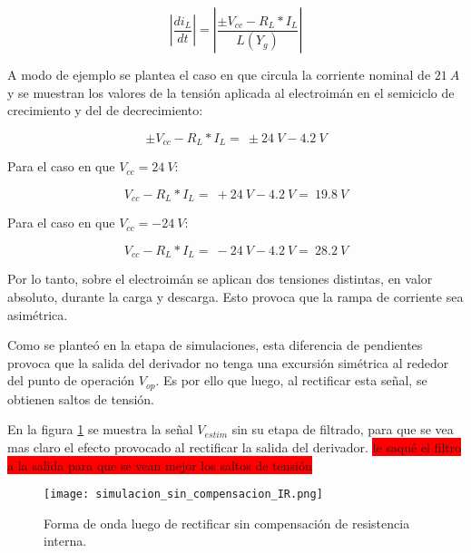 \begin{equation} \label{eq_Vbus-didt-RL}
	\left|\frac{di_L}{dt}\right|=\left|\frac{\pm V_{cc}-R_L*I_L}{L(Y_g)}\right|
\end{equation}

A modo de ejemplo se plantea el caso en que circula la corriente nominal de $21\:A$ y se muestran los valores de la tensión aplicada al electroimán en el semiciclo de crecimiento y del de decrecimiento:

\begin{equation} \label{eq_Vbus-didt-RL-2}
	\pm V_{cc}-R_L*I_L=\ \pm 24\:V-4.2\:V
\end{equation}

Para el caso en que $V_{cc}=24\:V$:

\begin{equation} \label{eq_Vbus-didt-RL-3}
	V_{cc}-R_L*I_L=\ +24\:V-4.2\:V=\ 19.8\:V
\end{equation}

Para el caso en que $V_{cc}=-24\:V$:

\begin{equation} \label{eq_Vbus-didt-RL-4}
	V_{cc}-R_L*I_L=\ -24\:V-4.2\:V=\ 28.2\:V
\end{equation}

Por lo tanto, sobre el electroimán se aplican dos tensiones distintas, en valor absoluto, durante la carga y descarga. Esto provoca que la rampa de corriente sea asimétrica.

Como se planteó en la etapa de simulaciones, esta diferencia de pendientes provoca que la salida del derivador no tenga una excursión simétrica al rededor del punto de operación $V_{op}$. Es por ello que luego, al rectificar esta señal, se obtienen saltos de tensión.

En la figura \ref{fig:img_simulacion_sin_compensacion_IR} se muestra la señal $V_{estim}$ sin su etapa de filtrado, para que se vea mas claro el efecto provocado al rectificar la salida del derivador. 
\colorbox{red}{le saqué el filtro a la salida para que se vean mejor los saltos de tensión}


\begin{figure}[H]
	\centering
	\texttt{[image: simulacion\_sin\_compensacion\_IR.png]}
	\caption{Forma de onda luego de rectificar sin compensación de resistencia interna.}
	\label{fig:img_simulacion_sin_compensacion_IR}
\end{figure}

